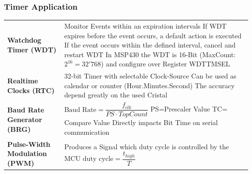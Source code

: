 \subsubsection{Timer Application}
\begin{tabular}{p{6cm} p{15cm}}
	\textbf{Watchdog Timer (\acs{WDT})} &
    Monitor Events within an expiration intervals\newline
	 If \acs{WDT} expires before the event occurs, a default action is executed\newline
	 If the event occurs within the defined interval, cancel and restart WDT\newline
	 In MSP430 the \acs{WDT} is 16-Bit (MaxCount: $2^{16}=32'768$) \newline
	 and configure over Register WDTTMSEL\\
     
	\textbf{Realtime Clocks (\acs{RTC})} &
    32-bit Timer with selectable Clock-Source\newline
    Can be used as calendar or counter (Hour.Minutes.Second)\newline
    The accuracy depend greatly on the used Cristal\\
    
	\textbf{Baud Rate Generator (\acs{BRG})} &
     $ \text{Baud Rate}=\dfrac{f_{clk}}{PS \cdot TopCount} $\newline
     PS=Prescaler Value \quad TC= Compare Value\newline
     Directly impacts Bit Time on serial communication\\
     
	\textbf{Pulse-Width Modulation (\acs{PWM})} &
    Produces a Signal which duty cycle is controlled by the \acs{MCU} \newline
    $ \text{duty cycle}=\dfrac{t_{high}}{T} $\\
\end{tabular}

